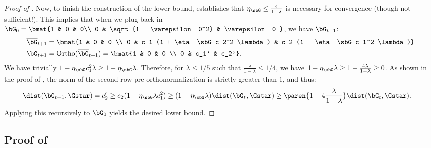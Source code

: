 \begin{proof}[Proof of ]
Now, to finish the construction of the lower bound,  establishes that $\eta_\sbG \leq \frac{4}{1-\lambda}$ is necessary for convergence (though not sufficient!). This implies that when we plug back in $\bG_0 = \bmat{1 & 0 & 0\\ 0 & \sqrt{1 - \varepsilon_0^2} & \varepsilon_0 }$, we have $\bG_{t+1}$:
\begin{align*}
    \overline\bG_{t+1} &= \bmat{1 & 0 & 0 \\
        0 & c_1 (1 + \eta_\sbG c_2^2 \lambda) & c_2 (1 - \eta_\sbG c_1^2 \lambda)} \\
    \bG_{t+1} &= \mathrm{Ortho}(\overline\bG_{t+1}) = \bmat{1 & 0 & 0 \\
        0 & c_1' & c_2'}.
\end{align*}
We have trivially $1 - \eta_\sbG c_1^2 \lambda \geq 1 - \eta_\sbG \lambda$. Therefore, for $\lambda \leq 1/5$ such that $\frac{\lambda}{1-\lambda}\leq 1/4$, we have $1 - \eta_\sbG \lambda \geq 1 - \frac{4\lambda}{1-\lambda} \geq 0$.
As shown in the proof of , the norm of the second row pre-orthonormalization is strictly greater than $1$, and thus:
\begin{align*}
    \dist(\bG_{t+1}, \Gstar) = c_2' &\geq c_2 (1 - \eta_\sbG\lambda c_1^2) \geq (1 - \eta_\sbG \lambda) \dist(\bG_t, \Gstar)\geq \paren{1 - 4\frac{\lambda}{1-\lambda}}\dist(\bG_t, \Gstar).
\end{align*}
Applying this recursively to $\bG_0$ yields the desired lower bound.
\end{proof}



\subsection{Proof of }

